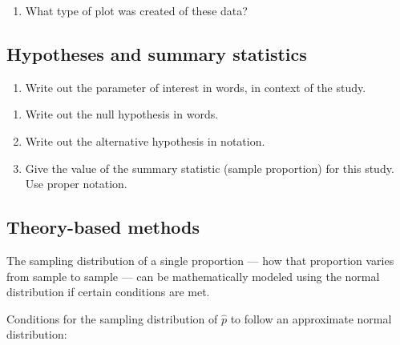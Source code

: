 \documentclass[
]{report}
\providecommand{\tightlist}{%
  \setlength{\itemsep}{0pt}\setlength{\parskip}{0pt}}
\begin{document}
\begin{enumerate}
\def\labelenumi{\arabic{enumi}.}
\tightlist
\item
  What type of plot was created of these data?
\end{enumerate}

\vspace{0.2in}

\subsection*{Hypotheses and summary statistics}\label{hypotheses-and-summary-statistics}

\begin{enumerate}
\def\labelenumi{\arabic{enumi}.}
\setcounter{enumi}{1}
\tightlist
\item
  Write out the parameter of interest in words, in context of the study.
\end{enumerate}

\vspace{1in}

\begin{enumerate}
\def\labelenumi{\arabic{enumi}.}
\setcounter{enumi}{2}
\item
  Write out the null hypothesis in words.
  \vspace{1in}
\item
  Write out the alternative hypothesis in notation.
  \vspace{0.4in}
\item
  Give the value of the summary statistic (sample proportion) for this study. Use proper notation.
\end{enumerate}

\vspace{0.3in}

\newpage

\subsection*{Theory-based methods}\label{theory-based-methods-1}

The sampling distribution of a single proportion --- how that proportion varies from sample to sample --- can be mathematically modeled using the normal distribution if certain conditions are met.

Conditions for the sampling distribution of \(\hat{p}\) to follow an approximate normal distribution:
\end{document}
